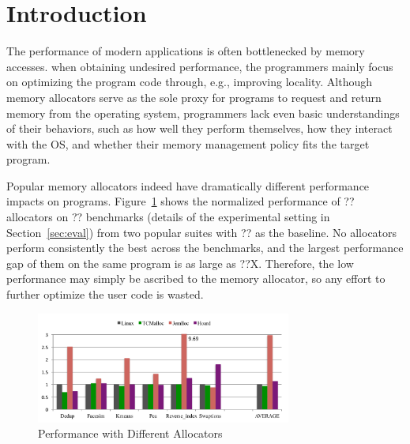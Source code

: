 

\section{Introduction}


The performance of modern applications is often bottlenecked by memory accesses. when obtaining undesired performance, the programmers mainly focus on optimizing the program code through, e.g., improving locality. Although memory allocators serve as the sole proxy for programs to request and return memory from the operating system, programmers lack even basic understandings of their behaviors, such as how well they perform themselves, how they interact with the OS, and whether their memory management policy fits the target program. 

Popular memory allocators indeed have dramatically different performance impacts on programs. Figure~\ref{fig:motivation} shows the normalized performance of ?? allocators on ?? benchmarks (details of the experimental setting in Section~\ref{sec:eval}) from two popular suites with ?? as the baseline. No allocators perform consistently the best across the benchmarks, and the largest performance gap of them on the same program is as large as ??X. Therefore, the low performance may simply be ascribed to the memory allocator, so any effort to further optimize the user code is wasted.

\begin{figure}[!ht]
\centering
\includegraphics[width=3.3in]{figures/motivation}
\caption{Performance with Different Allocators\label{fig:motivation}}
\end{figure}


